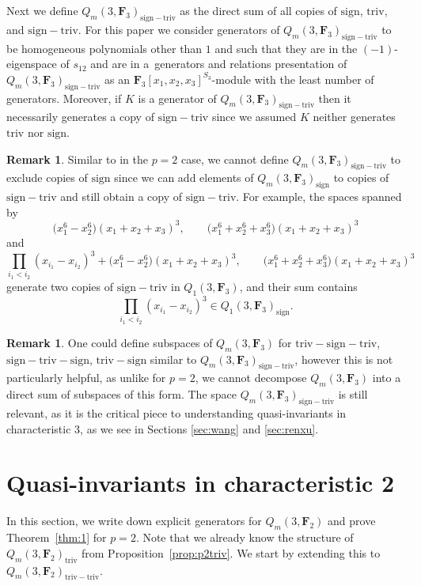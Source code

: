\documentclass[pdftex]{sigma}
\theoremstyle{definition}
\newtheorem{Remark}[Theorem]{Remark}
\numberwithin{equation}{section}
\newcommand{\F}{\mathbf{F}}
\newcommand{\triv}{\mathrm{triv}}
\newcommand{\sign}{\mathrm{sign}}
\newcommand{\trix}{\mathrm{triv-sign-triv}}
\newcommand{\six}{\mathrm{sign-triv-sign}}
\newcommand{\siv}{\mathrm{sign-triv}}
\newcommand{\tign}{\mathrm{triv-sign}}
\newcommand{\trtr}{\mathrm{triv-triv}}
\begin{document}
Next we define $Q_m(3,\mathbf{F}_3)_{\siv}$ as the direct sum of all copies of $\sign$, $\triv$, and $\siv$. For this paper we consider generators of $Q_m(3,\mathbf{F}_3)_{\siv}$ to be homogeneous polynomials other than $1$ and  such that they are in the $(-1)$-eigenspace of $s_{12}$ and are in a~generators and relations presentation of $Q_m(3,\mathbf{F}_3)_{\siv}$ as an $\mathbf{F}_3[x_1,x_2,x_3]^{S_3}$-module with the least number of generators. Moreover, if $K$ is a generator of $Q_m(3,\mathbf{F}_3)_{\siv}$ then it necessarily generates a copy of $\siv$ since we assumed $K$ neither generates $\triv$ nor $\sign$.

\begin{Remark}
 Similar to in the $p=2$ case, we cannot define $Q_m(3,\mathbf{F}_3)_{\siv}$ to exclude copies of $\sign$ since we can add elements of $Q_m(3,\mathbf{F}_3)_{\sign}$ to copies of $\siv$ and still obtain a copy of $\siv$. For example, the spaces spanned by
 \[\big(x_1^6-x_2^6\big)(x_1+x_2+x_3)^3,\qquad\big(x_1^6+x_2^6+x_3^6\big)(x_1+x_2+x_3)^3\]
 and
 \[\prod_{i_1<i_2}(x_{i_1}-x_{i_2})^{3}+\big(x_1^6-x_2^6\big)(x_1+x_2+x_3)^3,\qquad\big(x_1^6+x_2^6+x_3^6\big)(x_1+x_2+x_3)^3\]
 generate two copies of $\siv$ in $Q_1(3,\F_3)$, and their sum contains
 \[\prod_{i_1<i_2}(x_{i_1}-x_{i_2})^{3}\in Q_1(3,\mathbf{F}_3)_{\sign}.\]
\end{Remark}

\begin{Remark}
 One could define subspaces of $Q_m(3,\mathbf{F}_3)$ for $\trix$, $\six$, $\tign$ similar to $Q_m(3,\mathbf{F}_3)_{\siv}$, however this is not particularly helpful, as unlike for ${p=2}$, we cannot decompose $Q_m(3,\mathbf{F}_3)$ into a direct sum of subspaces of this form. The space $Q_m(3,\mathbf{F}_3)_{\siv}$ is still relevant, as it is the critical piece to understanding quasi-invariants in characteristic 3, as we see in Sections \ref{sec:wang} and \ref{sec:renxu}.
\end{Remark}

\section[Quasi-invariants in characteristic 2]{Quasi-invariants in characteristic 2}\label{sec:p=2}

In this section, we write down explicit generators for $Q_m(3,\mathbf{F}_2)$ and prove Theorem~\ref{thm:1} for $p=2$. Note that we already know the structure of $Q_m(3,\mathbf{F}_2)_\triv$ from Proposition~\ref{prop:p2triv}. We start by extending this to $Q_m(3,\mathbf{F}_2)_\trtr$.
\end{document}
